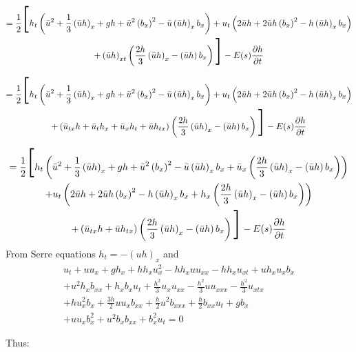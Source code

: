 \documentclass[12pt]{article}
\begin{document}
\begin{multline}
= \frac{1}{2}\scalebox{3}{[}h_t\left(\bar{u}^2 +  \frac{1}{3}\left(\bar{u}h\right)_x + gh + \bar{u}^2 \left(b_x \right)^2 -\bar{u}\left(\bar{u}h \right)_{x}b_x \right) + u_t\left(2\bar{u} h  + 2\bar{u}h\left(b_x \right)^2 - h\left(\bar{u}h \right)_{x}b_x \right) \\ + \left(\bar{u}h\right)_{xt} \left(\frac{2h}{3}\left(\bar{u}h\right)_x   - \left(\bar{u}h \right)b_x\right)\scalebox{3}{]} - E(s)\frac{\partial h}{\partial t}
\end{multline}

\begin{multline}
= \frac{1}{2}\scalebox{3}{[}h_t\left(\bar{u}^2 +  \frac{1}{3}\left(\bar{u}h\right)_x + gh + \bar{u}^2 \left(b_x \right)^2 -\bar{u}\left(\bar{u}h \right)_{x}b_x \right) + u_t\left(2\bar{u} h  + 2\bar{u}h\left(b_x \right)^2 - h\left(\bar{u}h \right)_{x}b_x \right) \\ + \left(\bar{u}_{tx} h + \bar{u}_t h_x + \bar{u}_xh_t +\bar{u}h_{tx} \right)  \left(\frac{2h}{3}\left(\bar{u}h\right)_x   - \left(\bar{u}h \right)b_x\right)\scalebox{3}{]} - E(s)\frac{\partial h}{\partial t}
\end{multline}

\begin{multline}
= \frac{1}{2}\scalebox{3}{[}h_t\left(\bar{u}^2 +  \frac{1}{3}\left(\bar{u}h\right)_x + gh + \bar{u}^2 \left(b_x \right)^2 -\bar{u}\left(\bar{u}h \right)_{x}b_x + \bar{u}_x\left(\frac{2h}{3}\left(\bar{u}h\right)_x   - \left(\bar{u}h \right)b_x\right) \right)  \\ + u_t\left(2\bar{u} h  + 2\bar{u}h\left(b_x \right)^2 - h\left(\bar{u}h \right)_{x}b_x +  h_x\left(\frac{2h}{3}\left(\bar{u}h\right)_x   - \left(\bar{u}h \right)b_x\right) \right) \\ + \left(\bar{u}_{tx} h +\bar{u}h_{tx} \right)  \left(\frac{2h}{3}\left(\bar{u}h\right)_x   - \left(\bar{u}h \right)b_x\right)\scalebox{3}{]} - E(s)\frac{\partial h}{\partial t}
\end{multline}
From Serre equations $h_t = -(uh)_x$ and 
\begin{multline*}
u_t+ uu_x + gh_x  + hh_xu_x^2 - hh_xuu_{xx}  - hh_xu_{xt} + uh_xu_xb_x \\ + u^2h_xb_{xx} + h_xb_xu_t  + \frac{h^2}{3}u_xu_{xx} - \frac{h^2}{3}u u_{xxx} - \frac{h^2}{3}u_{xtx}  \\ +  hu_x^2b_x  + \frac{3h}{2}uu_xb_{xx}+ \frac{h}{2}u^2b_{xxx}  + \frac{h}{2}b_{xx}u_t   + gb_x \\  + u u_xb_x^2 + u^2 b_xb_{xx} +  b_x^2u_t = 0
\end{multline*}

Thus:





\end{document}
